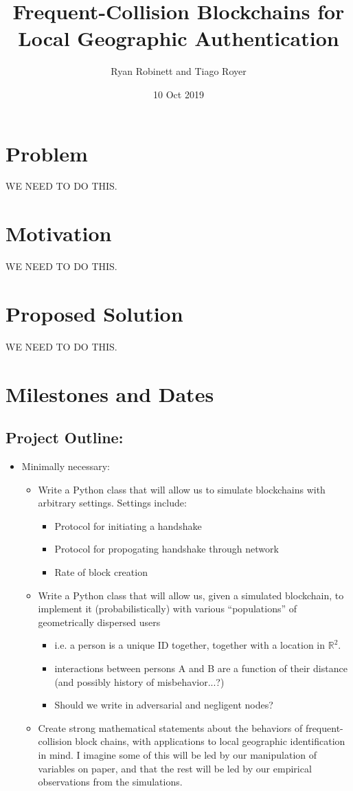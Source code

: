 \documentclass{article}
\title{Frequent-Collision Blockchains for Local Geographic Authentication}
\author{Ryan Robinett and Tiago Royer}
\date{10 Oct 2019}
\begin{document}
\maketitle

\section*{Problem}
WE NEED TO DO THIS.

\section*{Motivation}
WE NEED TO DO THIS.

\section*{Proposed Solution}
WE NEED TO DO THIS.

\section*{Milestones and Dates}
\subsection*{Project Outline:}
\begin{itemize}
	\item Minimally necessary:
	\begin{itemize}
		\item Write a Python class that will allow us to simulate
			blockchains with arbitrary settings. Settings include:
		\begin{itemize}
			\item Protocol for initiating a handshake
			\item Protocol for propogating handshake through network
			\item Rate of block creation
		\end{itemize}
		\item Write a Python class that will allow us, given a simulated
			blockchain, to implement it (probabilistically) with
			various ``populations'' of geometrically dispersed users
		\begin{itemize}
			\item i.e. a person is a unique ID together,
				together with a location in $\mathbb{R}^2$.
			\item interactions between persons A and B are
				a function of their distance (and possibly
				history of misbehavior...?)
			\item Should we write in adversarial and negligent nodes?
		\end{itemize}
		\item Create strong mathematical statements about
			the behaviors of frequent-collision block chains,
			with applications to local geographic identification
			in mind. I imagine some of this will be led by our
			manipulation of variables on paper,
			and that the rest will be led by our empirical
			observations from the simulations.
	\end{itemize}
\end{itemize}
\end{document}
